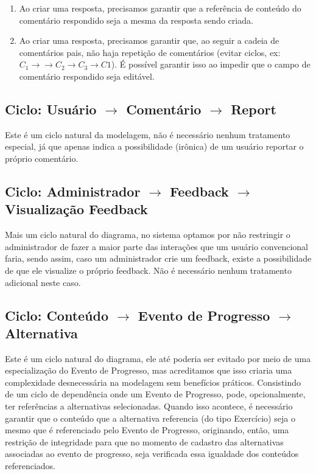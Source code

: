 \begin{enumerate}
  \item Ao criar uma resposta, precisamos garantir que a referência de conteúdo do
        comentário respondido seja a mesma da resposta sendo criada.
  \item Ao criar uma resposta, precisamos garantir que, ao seguir a cadeia de
        comentários pais, não haja repetição de comentários (evitar ciclos, ex: $C_1
          \rightarrow \rightarrow C_2 \rightarrow C_3 \rightarrow C1$). É possível
        garantir isso ao impedir que o campo de comentário respondido seja editável.
\end{enumerate}

\subsection{Ciclo: Usuário $\rightarrow$ Comentário $\rightarrow$ Report}

Este é um ciclo natural da modelagem, não é necessário nenhum tratamento
especial, já que apenas indica a possibilidade (irônica) de um usuário reportar
o próprio comentário.

\subsection{Ciclo: Administrador $\rightarrow$ Feedback $\rightarrow$ Visualização Feedback}

Mais um ciclo natural do diagrama, no sistema optamos por não restringir o
administrador de fazer a maior parte das interações que um usuário convencional
faria, sendo assim, caso um administrador crie um feedback, existe a
possibilidade de que ele visualize o próprio feedback. Não é necessário nenhum
tratamento adicional neste caso.

\subsection{Ciclo: Conteúdo $\rightarrow$ Evento de Progresso $\rightarrow$ Alternativa}

Este é um ciclo natural do diagrama, ele até poderia ser evitado por meio de
uma especialização do Evento de Progresso, mas acreditamos que isso criaria uma
complexidade desnecessária na modelagem sem benefícios práticos. Consistindo de
um ciclo de dependência onde um Evento de Progresso, pode, opcionalmente, ter
referências a alternativas selecionadas. Quando isso acontece, é necessário
garantir que o conteúdo que a alternativa referencia (do tipo Exercício) seja o
mesmo que é referenciado pelo Evento de Progresso, originando, então, uma
restrição de integridade para que no momento de cadastro das alternativas
associadas ao evento de progresso, seja verificada essa igualdade dos conteúdos
referenciados.

